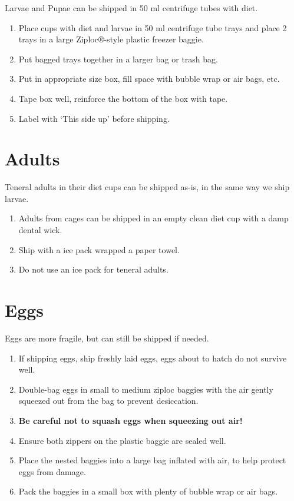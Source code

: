 \documentclass{sop_class}[overrideChapters] %
\begin{document}
{Larvae and Pupae can be shipped in 50 ml centrifuge tubes with diet.
\begin{enumerate}
\def\labelenumi{\arabic{enumi}.}
\item
  Place cups with diet and larvae in 50 ml centrifuge tube trays and place 2
  trays in a large Ziploc®-style plastic freezer baggie.
\item
  Put bagged trays together in a larger bag or trash bag.
\item
  Put in appropriate size box, fill space with bubble wrap or air
  bags, etc.
\item
  Tape box well, reinforce the bottom of the box with tape.
\item
  Label with `This side up' before shipping.
\end{enumerate}
\hypertarget{ship-adults}{%
\section{Adults}\label{ship-adults}}

Teneral adults in their diet cups can be shipped as-is, in the same way
we ship larvae.
\begin{enumerate}
\def\labelenumi{\arabic{enumi}.}
\item
  Adults from cages can be shipped in an empty clean diet cup with a
  damp dental wick.
\item
  Ship with a ice pack wrapped a paper towel.
\item
  Do not use an ice pack for teneral adults.
\end{enumerate}
\hypertarget{ship-eggs}{%
\section{Eggs}\label{ship-eggs}}

Eggs are more fragile, but can still be shipped if needed.
\begin{enumerate}
\def\labelenumi{\arabic{enumi}.}
\item
  If shipping eggs, ship freshly laid eggs, eggs about to hatch do not
  survive well.
\item
  Double-bag eggs in small to medium ziploc baggies with the air
  gently squeezed out from the bag to prevent desiccation.
\item
  \textbf{Be careful not to squash eggs when squeezing out air!}
\item
  Ensure both zippers on the plastic baggie are sealed well.
\item
  Place the nested baggies into a large bag inflated with air, to help
  protect eggs from damage.
\item
  Pack the baggies in a small box with plenty of bubble wrap or air
  bags.
\end{enumerate}
\hypertarget{facility}{%
}}
\end{document}
